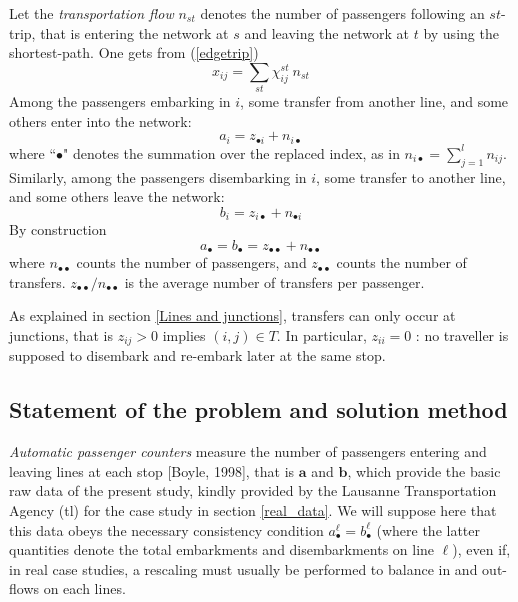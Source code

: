 \documentclass{bmcart}
\begin{document}
Let the \emph{transportation flow} $n_{st}$ denotes the number of passengers following an $st$-trip, that is entering the network at $s$ and leaving the network at $t$ by using the shortest-path. One gets from (\ref{edgetrip}) 
\begin{equation}
\label{equationGG}
x_{ij}=\sum_{st}\chi_{ij}^{st}\:  n_{st}
\end{equation}
Among the passengers embarking in $i$, some transfer from another line, and some others enter into the network: 
\begin{equation}
\label{entrer}
a_i=z_{\bullet i}+n_{i\bullet}
\end{equation}
where  ``$\bullet$" denotes the summation over the replaced index, as in $n_{i\bullet}=\sum_{j=1}^l n_{ij}$. Similarly, among the passengers disembarking in $i$, some transfer to another line, and some others leave the network: 
\begin{equation}
\label{sortir}
b_i=z_{i\bullet}+n_{\bullet i}
\end{equation}
By construction
\begin{displaymath}
a_{\bullet}=b_{\bullet}=z_{\bullet\bullet}+n_{\bullet\bullet}
\end{displaymath}
where $n_{\bullet\bullet}$ counts the number of passengers, and $z_{\bullet\bullet}$ counts the number of transfers. $z_{\bullet\bullet}/n_{\bullet\bullet}$  is the average number of transfers per passenger. 

\vspace*{0.1cm}



As explained in section \ref{Lines and junctions}, transfers can only occur at junctions, that is $z_{ij}>0$ implies $(i, j) \in T$. In particular,  $z_{ii}=0$ : no traveller is supposed to disembark and re-embark later at the same stop. 


 
\subsection{Statement of the problem and solution method}
\emph{Automatic passenger counters} measure the number of passengers entering and leaving lines at each stop [Boyle, 1998], that is $\mathbf{a}$ and $\mathbf{b}$, which provide the basic raw data of the present study, kindly provided by the Lausanne Transportation Agency (tl) for the case study in section \ref{real_data}. We will suppose here that this data obeys the necessary consistency condition $a_\bullet^\ell=b_\bullet^\ell$ (where the latter quantities denote the total embarkments and disembarkments on line $\ell$), even if, in real case studies, a rescaling must usually be performed to balance in and out-flows on each lines.
\end{document}
